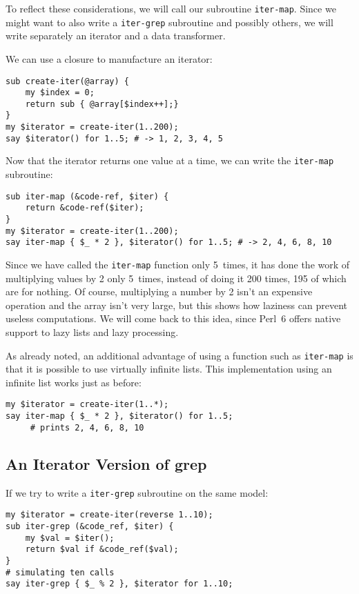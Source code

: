 To reflect these considerations, we will call our subroutine 
{\tt iter-map}. Since we might want to also write a 
{\tt iter-grep} subroutine and possibly others, we will 
write separately an iterator and a data transformer.

We can use a closure to manufacture an iterator:

\begin{verbatim}
sub create-iter(@array) {
    my $index = 0;
    return sub { @array[$index++];}
}
my $iterator = create-iter(1..200);
say $iterator() for 1..5; # -> 1, 2, 3, 4, 5
\end{verbatim} 

Now that the iterator returns one value at a time, we 
can write the {\tt iter-map} subroutine:

\begin{verbatim}
sub iter-map (&code-ref, $iter) {
    return &code-ref($iter);
}
my $iterator = create-iter(1..200);
say iter-map { $_ * 2 }, $iterator() for 1..5; # -> 2, 4, 6, 8, 10
\end{verbatim}

Since we have called the {\tt iter-map} function only 5~times, 
it has done the work of multiplying values by 2 only 5~times, 
instead of doing it 200 times, 195 of which are for nothing. 
Of course, multiplying a number by 2 isn't an expensive 
operation and the array isn't very large, but this shows 
how laziness can prevent useless computations. We will come 
back to this idea, since Perl~6 offers native support to lazy 
lists and lazy processing.

As already noted, an additional advantage of using a function 
such as {\tt iter-map} is that it is possible to use 
virtually infinite lists. This implementation using an 
infinite list works just as before:

\begin{verbatim}
my $iterator = create-iter(1..*);
say iter-map { $_ * 2 }, $iterator() for 1..5;
     # prints 2, 4, 6, 8, 10
\end{verbatim}

\subsection{An Iterator Version of grep}

If we try to write a {\tt iter-grep} subroutine on the same 
model:

\begin{verbatim}
my $iterator = create-iter(reverse 1..10);
sub iter-grep (&code_ref, $iter) {
    my $val = $iter();
    return $val if &code_ref($val);
}
# simulating ten calls
say iter-grep { $_ % 2 }, $iterator for 1..10;
\end{verbatim}

